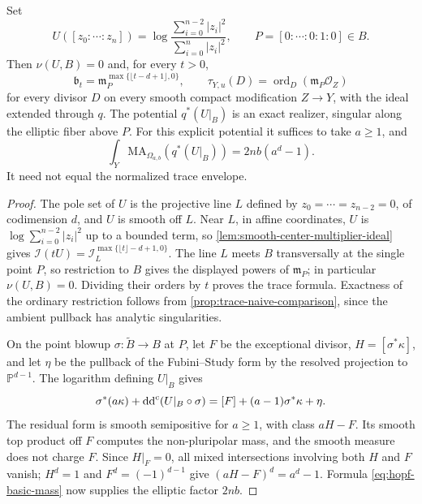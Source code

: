 \begin{example}\label{ex:hopf-point-trace}
Set
\[
 U([z_0:\cdots:z_n])
 =\log\frac{\sum_{i=0}^{n-2}|z_i|^2}{\sum_{i=0}^n|z_i|^2},
 \qquad P=[0:\cdots:0:1:0]\in B.
\]
Then $\nu(U,B)=0$ and, for every $t>0$,
\[
 \mathfrak b_t=\mathfrak m_P^{\max\{\lfloor t-d+1\rfloor,0\}},
 \qquad
 \tau_{Y,u}(D)=\operatorname{ord}_D(\mathfrak m_P\mathcal O_Z)
\]
for every divisor $D$ on every smooth compact modification $Z\to Y$, with the ideal extended through $q$. The potential $q^*(U|_B)$ is an exact realizer, singular along the elliptic fiber above $P$. For this explicit potential it suffices to take $a\geq1$, and
\[
 \int_Y\mathrm{MA}_{\Omega_{a,b}}(q^*(U|_B))=2nb(a^d-1).
\]
It need not equal the normalized trace envelope.
\end{example}
\begin{proof}
The pole set of $U$ is the projective line $L$ defined by $z_0=\cdots=z_{n-2}=0$, of codimension $d$, and $U$ is smooth off $L$. Near $L$, in affine coordinates, $U$ is $\log\sum_{i=0}^{n-2}|z_i|^2$ up to a bounded term, so \cref{lem:smooth-center-multiplier-ideal} gives $\mathcal I(tU)=\mathcal I_L^{\max\{\lfloor t\rfloor-d+1,0\}}$. The line $L$ meets $B$ transversally at the single point $P$, so restriction to $B$ gives the displayed powers of $\mathfrak m_P$; in particular $\nu(U,B)=0$. Dividing their orders by $t$ proves the trace formula. Exactness of the ordinary restriction follows from \cref{prop:trace-naive-comparison}, since the ambient pullback has analytic singularities.

On the point blowup $\sigma\colon\widetilde B\to B$ at $P$, let $F$ be the exceptional divisor, $H=[\sigma^*\kappa]$, and let $\eta$ be the pullback of the Fubini--Study form by the resolved projection to $\mathbb P^{d-1}$. The logarithm defining $U|_B$ gives
\[
 \sigma^*(a\kappa)+\mathrm{dd}^{\mathrm{c}}(U|_B\circ\sigma)
       =[F]+(a-1)\sigma^*\kappa+\eta.
\]
The residual form is smooth semipositive for $a\geq1$, with class $aH-F$. Its smooth top product off $F$ computes the non-pluripolar mass, and the smooth measure does not charge $F$. Since $H|_F=0$, all mixed intersections involving both $H$ and $F$ vanish; $H^d=1$ and $F^d=(-1)^{d-1}$ give $(aH-F)^d=a^d-1$. Formula \eqref{eq:hopf-basic-mass} now supplies the elliptic factor $2nb$.
\end{proof}

